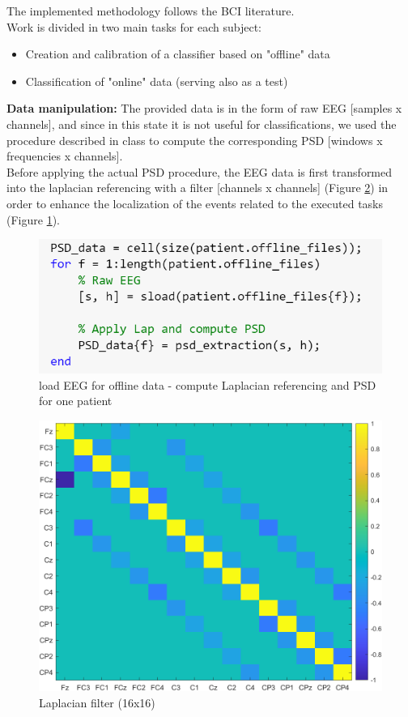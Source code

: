 The implemented methodology follows the BCI literature. \\
Work is divided in two main tasks for each subject: 
\begin{itemize}
\item Creation and calibration of a classifier based on "offline" data
\item Classification of "online" data (serving also as a test)
\end{itemize}\noindent
{\Large \textbf{Data manipulation:}}
The provided data is in the form of raw EEG [samples x channels], and since in this state it is not useful for classifications, we used the procedure described in class to compute the corresponding PSD [windows x frequencies x channels].\\
Before applying the actual PSD procedure, the EEG data is first transformed into the laplacian referencing with a filter [channels x channels] (Figure \ref{fig:laplacian_filter}) in order to enhance the localization of the events related to the executed tasks (Figure \ref{fig:code_raw_eeg_lap}).\\

\begin{figure}[h!]
	\begin{center}
		 \includegraphics[width=0.4\linewidth]{img/code_raw_eeg_lap.PNG}
	\end{center}

	 \caption{load EEG for offline data - compute Laplacian referencing and PSD for one patient}
	 \label{fig:code_raw_eeg_lap}
\end{figure}

\begin{figure}[h!]
	\begin{center}
		 \includegraphics[width=0.5\linewidth]{img/laplacian_filter.png}
	\end{center}

	 \caption{Laplacian filter (16x16)}
	 \label{fig:laplacian_filter}
\end{figure}

